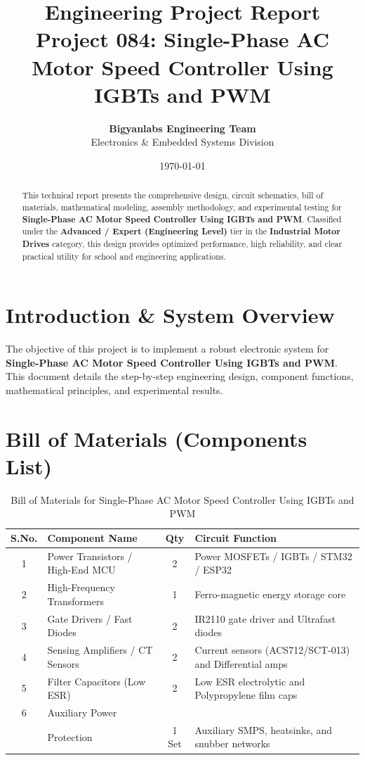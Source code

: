 \documentclass[11pt,a4paper]{article}
\title{\textbf{\Huge Engineering Project Report}\\[0.5em] \Large Project 084: Single-Phase AC Motor Speed Controller Using IGBTs and PWM}
\author{\textbf{Bigyanlabs Engineering Team}\\ Electronics \& Embedded Systems Division}
\date{\today}
\begin{document}
\maketitle
\thispagestyle{empty}

\begin{abstract}
This technical report presents the comprehensive design, circuit schematics, bill of materials, mathematical modeling, assembly methodology, and experimental testing for \textbf{Single-Phase AC Motor Speed Controller Using IGBTs and PWM}. Classified under the \textbf{Advanced / Expert (Engineering Level)} tier in the \textbf{Industrial Motor Drives} category, this design provides optimized performance, high reliability, and clear practical utility for school and engineering applications.
\end{abstract}

\newpage
\tableofcontents
\newpage

\section{Introduction \& System Overview}
The objective of this project is to implement a robust electronic system for \textbf{Single-Phase AC Motor Speed Controller Using IGBTs and PWM}. This document details the step-by-step engineering design, component functions, mathematical principles, and experimental results.

\section{Bill of Materials (Components List)}
\begin{table}[h!]
\centering
\caption{Bill of Materials for Single-Phase AC Motor Speed Controller Using IGBTs and PWM}
\vspace{0.5em}
\begin{tabular}{clcp{7cm}}
\toprule
\textbf{S.No.} & \textbf{Component Name} & \textbf{Qty} & \textbf{Circuit Function} \\
\midrule
1 & Power Transistors / High-End MCU & 2 & Power MOSFETs / IGBTs / STM32 / ESP32 \\
2 & High-Frequency Transformers & 1 & Ferro-magnetic energy storage core \\
3 & Gate Drivers / Fast Diodes & 2 & IR2110 gate driver and Ultrafast diodes \\
4 & Sensing Amplifiers / CT Sensors & 2 & Current sensors (ACS712/SCT-013) and Differential amps \\
5 & Filter Capacitors (Low ESR) & 2 & Low ESR electrolytic and Polypropylene film caps \\
6 & Auxiliary Power \\& Protection & 1 Set & Auxiliary SMPS, heatsinks, and snubber networks \\
\bottomrule
\end{tabular}
\end{table}
\end{document}
